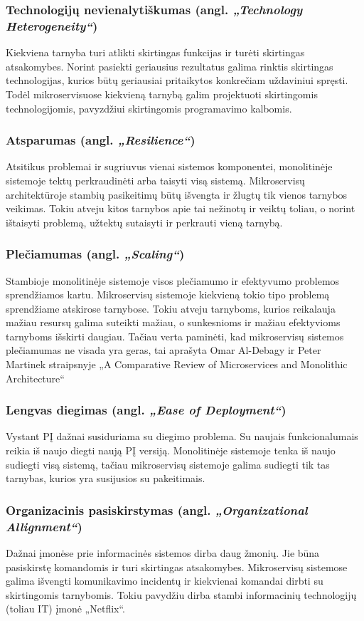\subsubsection{Technologijų nevienalytiškumas (angl. \textit{„Technology Heterogeneity“})}
Kiekviena tarnyba turi atlikti skirtingas funkcijas ir turėti skirtingas atsakomybes. Norint pasiekti
geriausius rezultatus galima rinktis skirtingas technologijas, kurios būtų geriausiai pritaikytos konkrečiam uždaviniui spręsti.
Todėl mikroservisuose kiekvieną tarnybą galim projektuoti skirtingomis technologijomis, pavyzdžiui skirtingomis programavimo kalbomis.
\subsubsection{Atsparumas (angl. \textit{„Resilience“})}
Atsitikus problemai ir sugriuvus vienai sistemos komponentei, monolitinėje sistemoje tektų perkraudinėti arba taisyti visą sistemą.
Mikroservisų architektūroje stambių pasikeitimų būtų išvengta ir žlugtų tik vienos tarnybos veikimas. Tokiu atveju kitos tarnybos
apie tai nežinotų ir veiktų toliau, o norint ištaisyti problemą, užtektų sutaisyti ir perkrauti vieną tarnybą.
\subsubsection{Plečiamumas (angl. \textit{„Scaling“})}
Stambioje monolitinėje sistemoje visos plečiamumo ir efektyvumo problemos sprendžiamos kartu. Mikroservisų sistemoje
kiekvieną tokio tipo problemą sprendžiame atskirose tarnybose. Tokiu atveju tarnyboms, kurios reikalauja mažiau resursų
galima suteikti mažiau, o sunkesnioms ir mažiau efektyvioms tarnyboms išskirti daugiau.
Tačiau verta paminėti, kad mikroservisų sistemos plečiamumas ne visada yra geras, tai aprašyta
Omar Al-Debagy ir Peter Martinek straipsnyje „A Comparative Review of Microservices and Monolithic Architecture“ \cite{Misc3}
\subsubsection{Lengvas diegimas (angl. \textit{„Ease of Deployment“})}
Vystant PĮ dažnai susiduriama su diegimo problema. Su naujais funkcionalumais reikia iš naujo diegti naują PĮ versiją.
Monolitinėje sistemoje tenka iš naujo sudiegti visą sistemą, tačiau mikroservisų sistemoje galima sudiegti tik tas tarnybas, kurios yra susijusios
su pakeitimais.
\subsubsection{Organizacinis pasiskirstymas (angl. \textit{„Organizational Allignment“})}
Dažnai įmonėse prie informacinės sistemos dirba daug žmonių. Jie būna pasiskirstę komandomis ir turi skirtingas atsakomybes.
Mikroservisų sistemose galima išvengti komunikavimo incidentų ir kiekvienai komandai dirbti su skirtingomis tarnybomis.
Tokiu pavydžiu dirba stambi informacinių technologijų (toliau IT) įmonė „Netflix“.
